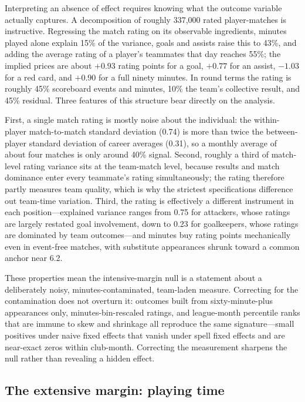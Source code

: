 Interpreting an absence of effect requires knowing what the outcome variable
actually captures. A decomposition of roughly 337{,}000 rated player-matches
is instructive. Regressing the match rating on its observable ingredients,
minutes played alone explain 15\% of the variance, goals and assists raise this
to 43\%, and adding the average rating of a player's teammates that day reaches
55\%; the implied prices are about $+0.93$ rating points for a goal, $+0.77$ for
an assist, $-1.03$ for a red card, and $+0.90$ for a full ninety minutes. In
round terms the rating is roughly 45\% scoreboard events and minutes, 10\% the
team's collective result, and 45\% residual. Three features of this structure
bear directly on the analysis.

First, a single match rating is mostly noise about the individual: the
within-player match-to-match standard deviation (0.74) is more than twice the
between-player standard deviation of career averages (0.31), so a monthly
average of about four matches is only around 40\% signal. Second, roughly a
third of match-level rating variance sits at the team-match level, because
results and match dominance enter every teammate's rating simultaneously; the
rating therefore partly measures team quality, which is why the strictest
specifications difference out team-time variation. Third, the rating is
effectively a different instrument in each position---explained variance ranges
from 0.75 for attackers, whose ratings are largely restated goal involvement,
down to 0.23 for goalkeepers, whose ratings are dominated by team
outcomes---and minutes buy rating points mechanically even in event-free
matches, with substitute appearances shrunk toward a common anchor near 6.2.

These properties mean the intensive-margin null is a statement about a
deliberately noisy, minutes-contaminated, team-laden measure. Correcting for the
contamination does not overturn it: outcomes built from sixty-minute-plus
appearances only, minutes-bin-rescaled ratings, and league-month percentile
ranks that are immune to skew and shrinkage all reproduce the same
signature---small positives under naive fixed effects that vanish under spell
fixed effects and are near-exact zeros within club-month. Correcting the
measurement sharpens the null rather than revealing a hidden effect.

\subsection{The extensive margin: playing time}
\label{sec:results-extensive}

